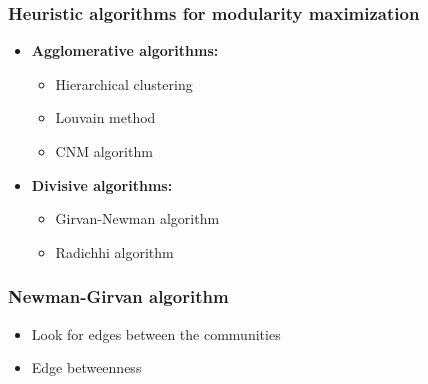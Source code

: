 \documentclass{beamer}
\begin{document}
\begin{frame}
    \frametitle{Heuristic algorithms for modularity maximization}
    \centering
    \begin{itemize}
        \setlength\itemsep{2em}
        \item{{\bf Agglomerative algorithms:}
            
    \begin{itemize}
        \setlength\itemsep{1em}
        \item{Hierarchical clustering}
        \item{Louvain method}
        \item{CNM algorithm}
    \end{itemize}
            
            }
        \item{{\bf Divisive algorithms:}
            
    \begin{itemize}
        \setlength\itemsep{1em}
        \item{Girvan-Newman algorithm}
        \item{Radichhi algorithm}
    \end{itemize}
            
            
            }
    \end{itemize}
\end{frame}
\begin{frame}
    \frametitle{Newman-Girvan algorithm}
    \centering
    
    \begin{itemize}
        \setlength\itemsep{1em}
        \item{Look for edges between the communities}

        \item{Edge betweenness}
    \end{itemize}
\end{frame}
\begin{frame}
    \frametitle{}
    \centering
\end{frame}
\begin{frame}
    \frametitle{}
    \centering
\end{frame}
\end{document}
